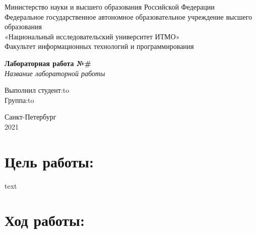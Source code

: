 \documentclass[a4paper,14pt]{article}
\begin{document}
\begin{titlepage}
\newpage

\begin{center}
Министерство науки и высшего образования Российской Федерации\\
Федеральное государственное автономное образовательное учреждение высшего образования\\
«Национальный исследовательский университет ИТМО»\\
Факультет информационных технологий и программирования\\
\end{center}

\vspace{\fill}

\begin{center}
\textbf{Лабораторная работа №\#}\\
\textit{Название лабораторной работы}
\end{center}

\vspace{\fill}

\newbox{\lbox}
\newlength{\maxl}
\setlength{\maxl}{\wd\lbox}
\hfill\parbox{14cm}{
\hspace*{5cm}Выполнил студент:\hfill\hbox to\\
\hspace*{5cm}Группа:\hfill\hbox to\\
}


\vspace{8em}

\begin{center}
Санкт-Петербург \\2021
\end{center}

\end{titlepage}


\section*{Цель работы:}
text
\section*{Ход работы:}
\end{document}
